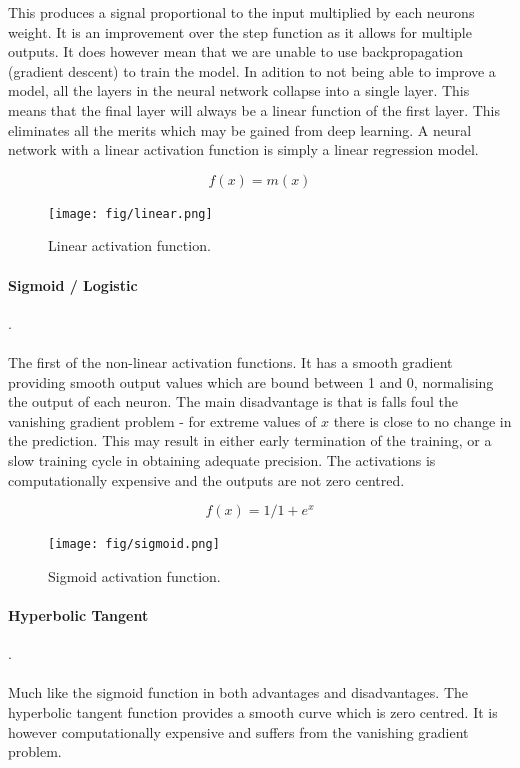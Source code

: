 \documentclass{pasa}%
\begin{document}
This produces a signal proportional to the input multiplied by each neurons weight. It is an improvement over the step function as it allows for multiple outputs. It does however mean that we are unable to use backpropagation (gradient descent) to train the model. In adition to not being able to improve a model, all the layers in the neural network collapse into a single layer. This means that the final layer will always be a linear function of the first layer. This eliminates all the merits which may be gained from deep learning. A neural network with a linear activation function is simply a linear regression model. 

\begin{equation}
    f(x) = m(x)
\end{equation}
\begin{figure}[H]
\centering
\texttt{[image: fig/linear.png]}
\caption{Linear activation function.}
\end{figure}

\paragraph{Sigmoid / Logistic}.\\\\
The first of the non-linear activation functions. It has a smooth gradient providing smooth output values which are bound between 1 and 0, normalising the output of each neuron. The main disadvantage is that is falls foul the vanishing gradient problem - for extreme values of $x$ there is close to no change in the prediction. This may result in either early termination of the training, or a slow training cycle in obtaining adequate precision. The activations is computationally expensive and the outputs are not zero centred. 

\begin{equation}
    f(x) = 1/1+e^x
\end{equation}
\begin{figure}[H]
\centering
\texttt{[image: fig/sigmoid.png]}
\caption{Sigmoid activation function.}
\end{figure}


\paragraph{Hyperbolic Tangent}.\\\\
Much like the sigmoid function in both advantages and disadvantages. The hyperbolic tangent function provides a smooth curve which is zero centred. It is however computationally expensive and suffers from the vanishing gradient problem.  
\end{document}

